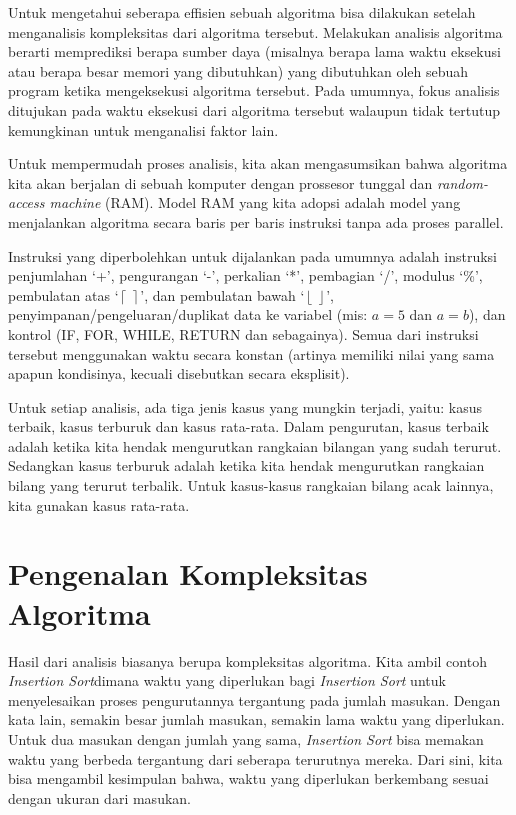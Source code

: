 Untuk mengetahui seberapa effisien sebuah algoritma bisa dilakukan setelah menganalisis kompleksitas dari algoritma tersebut. Melakukan analisis algoritma berarti memprediksi berapa sumber daya (misalnya berapa lama waktu eksekusi atau berapa besar memori yang dibutuhkan) yang dibutuhkan oleh sebuah program ketika mengeksekusi algoritma tersebut. Pada umumnya, fokus analisis ditujukan pada waktu eksekusi dari algoritma tersebut walaupun tidak tertutup kemungkinan untuk menganalisi faktor lain.

Untuk mempermudah proses analisis, kita akan mengasumsikan bahwa algoritma kita akan berjalan di sebuah komputer dengan prossesor tunggal dan \textit{random-access machine} (RAM). Model RAM yang kita adopsi adalah model yang menjalankan algoritma secara baris per baris instruksi tanpa ada proses parallel. 

Instruksi yang diperbolehkan untuk dijalankan pada umumnya adalah instruksi penjumlahan `+', pengurangan `-', perkalian `*', pembagian `/', modulus `\%', pembulatan atas `$\left\lceil\  \right\rceil$', dan pembulatan bawah `$\left\lfloor\ \right\rfloor$', penyimpanan/pengeluaran/duplikat data ke variabel (mis: $a = 5$ dan $a = b$), dan kontrol (IF, FOR, WHILE, RETURN dan sebagainya). Semua dari instruksi tersebut menggunakan waktu secara konstan (artinya memiliki nilai yang sama apapun kondisinya, kecuali disebutkan secara eksplisit).

Untuk setiap analisis, ada tiga jenis kasus yang mungkin terjadi, yaitu: kasus terbaik, kasus terburuk dan kasus rata-rata. Dalam pengurutan, kasus terbaik adalah ketika kita hendak mengurutkan rangkaian bilangan yang sudah terurut. Sedangkan kasus terburuk adalah ketika kita hendak mengurutkan rangkaian bilang yang terurut terbalik. Untuk kasus-kasus rangkaian bilang acak lainnya, kita gunakan kasus rata-rata.

\section{Pengenalan Kompleksitas Algoritma}
Hasil dari analisis biasanya berupa kompleksitas algoritma. Kita ambil contoh \textit{Insertion Sort}dimana waktu yang diperlukan bagi \textit{Insertion Sort} untuk menyelesaikan proses pengurutannya tergantung pada jumlah masukan. Dengan kata lain, semakin besar jumlah masukan, semakin lama waktu yang diperlukan. Untuk dua masukan dengan jumlah yang sama, \textit{Insertion Sort} bisa memakan waktu yang berbeda tergantung dari seberapa terurutnya mereka. Dari sini, kita bisa mengambil kesimpulan bahwa, waktu yang diperlukan berkembang sesuai dengan ukuran dari masukan.

